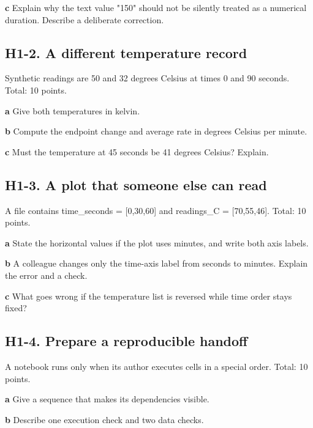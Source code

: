 \documentclass[11pt,letterpaper]{article}
\theoremstyle{definition}\newtheorem{definition}{Definition}\newtheorem{example}{Example}
\numberwithin{equation}{section}
\begin{document}
\textbf{c} Explain why the text value "150" should not be silently treated as a numerical duration. Describe a deliberate correction.

\par\noindent\begin{minipage}{\linewidth}
\subsection*{H1-2. A different temperature record}
Synthetic readings are 50 and 32 degrees Celsius at times 0 and 90 seconds. Total: 10 points.

\textbf{a} Give both temperatures in kelvin.

\end{minipage}\par\medskip
\textbf{b} Compute the endpoint change and average rate in degrees Celsius per minute.

\textbf{c} Must the temperature at 45 seconds be 41 degrees Celsius? Explain.

\par\noindent\begin{minipage}{\linewidth}
\subsection*{H1-3. A plot that someone else can read}
A file contains time\_seconds =\allowbreak{} [0,30,60] and readings\_C =\allowbreak{} [70,55,46]. Total: 10 points.

\textbf{a} State the horizontal values if the plot uses minutes, and write both axis labels.

\end{minipage}\par\medskip
\textbf{b} A colleague changes only the time-axis label from seconds to minutes. Explain the error and a check.

\textbf{c} What goes wrong if the temperature list is reversed while time order stays fixed?

\par\noindent\begin{minipage}{\linewidth}
\subsection*{H1-4. Prepare a reproducible handoff}
A notebook runs only when its author executes cells in a special order. Total: 10 points.

\textbf{a} Give a sequence that makes its dependencies visible.

\end{minipage}\par\medskip
\textbf{b} Describe one execution check and two data checks.
\end{document}
